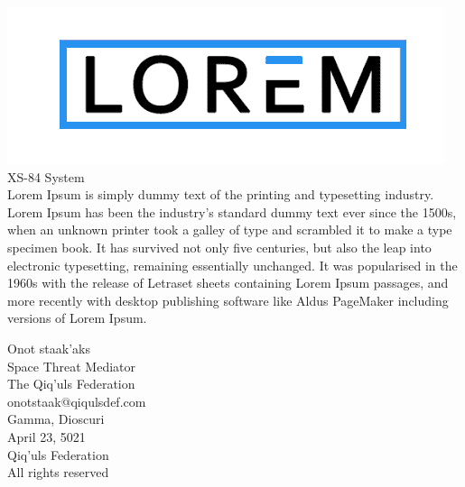 \begin{titlepage}
\noindent
\begin{center}
	\includegraphics[scale=0.3]{images/lorem-logo.png}\\[4ex]
	\titlefont XS-84 System \\[2ex]
	\sepline
	\addvspace{1cm}
	\normalsize{Lorem Ipsum is simply dummy text of the printing and typesetting industry. Lorem Ipsum has been the industry's standard dummy text ever since the 1500s, when an unknown printer took a galley of type and scrambled it to make a type specimen book. It has survived not only five centuries, but also the leap into electronic typesetting, remaining essentially unchanged. It was popularised in the 1960s with the release of Letraset sheets containing Lorem Ipsum passages, and more recently with desktop publishing software like Aldus PageMaker including versions of Lorem Ipsum.}
\end{center}
\null\vfill
\vspace*{1cm}
\noindent
\hfill
\begin{center}
{\Large{Onot staak'aks}}\\[1ex]
Space Threat Mediator\\
The Qiq'uls Federation\\
onotstaak@qiqulsdef.com\\[4ex]
Gamma, Dioscuri\\
April 23, 5021\\[8ex]
\small{
\textcopyright{} Qiq'uls Federation\\
All rights reserved}
\end{center}
\titlepagedecoration
\end{titlepage}
